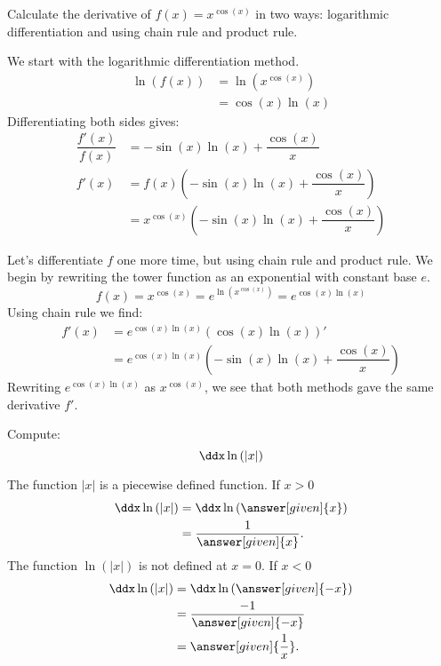 \documentclass{ximera}
\begin{document}
\begin{example}
	Calculate the derivative of $f(x) = x^{\cos(x)}$ in two ways: logarithmic differentiation and using chain rule and product rule.
	\begin{explanation}
		We start with the logarithmic differentiation method. 
		\begin{align*}
			\ln( f(x) ) &= \ln\left( x^{\cos(x)} \right) \\
				&= \cos(x) \ln(x)
		\end{align*}
		Differentiating both sides gives:
		\begin{align*} 
			\dfrac{f'(x)}{f(x)} &= -\sin(x)\ln(x) + \dfrac{\cos(x)}{x} \\
			f'(x) &= f(x)\left( -\sin(x)\ln(x) + \dfrac{\cos(x)}{x}\right)\\
				&= x^{\cos(x)} \left( -\sin(x)\ln(x) + \dfrac{\cos(x)}{x}\right)
		\end{align*}

		Let's differentiate $f$ one more time, but using chain rule and product rule.
		We begin by rewriting the tower function as an exponential with constant base $e$.
		\[ f(x) = x^{\cos(x)} = e^{\ln\left(x^{\cos(x)} \right)} = e^{\cos(x) \ln(x)} \]
		Using chain rule we find:
		\begin{align*}
			f'(x) &= e^{\cos(x)\ln(x)}\left( \cos(x)\ln(x)\right)'\\
				&= e^{\cos(x)\ln(x)}\left( -\sin(x) \ln(x) + \dfrac{\cos(x)}{x}\right)
		\end{align*}
		Rewriting $e^{\cos(x)\ln(x)}$ as $x^{\cos(x)}$, we see that both methods gave the same derivative $f'$. 
	\end{explanation}
\end{example}


\begin{example}
	Compute:
	\[ \ddx\ln{(|x|)} \]
	\begin{explanation}
		The function $|x|$ is a piecewise defined function.  If $x>0$
		\begin{align*}
			\ddx\ln{(|x|)} &= \ddx\ln{(\answer[given]{x})}\\
				&=\frac{1}{\answer[given]{x}}.
		\end{align*}
		The function $\ln{(|x|)}$ is not defined at $x=0$.  If $x<0$
		\begin{align*}
			\ddx\ln{(|x|)} &= \ddx\ln{(\answer[given]{-x})}\\
				&=\frac{-1}{\answer[given]{-x}}\\
				&=\answer[given]{\frac{1}{x}}.
		\end{align*}
	\end{explanation}
\end{example}
\end{document}
